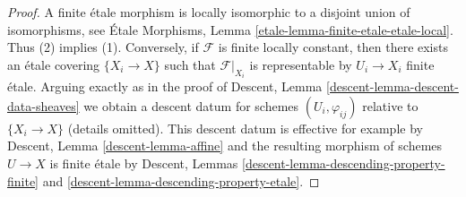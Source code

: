 \documentclass[10pt,a4paper]{amsart}
\theoremstyle{plain}
\theoremstyle{definition}
\theoremstyle{remark}
\numberwithin{equation}{subsection}
\begin{document}
\begin{proof}
A finite \'etale morphism is locally isomorphic to a disjoint union
of isomorphisms, see
\'Etale Morphisms, Lemma \ref{etale-lemma-finite-etale-etale-local}.
Thus (2) implies (1). Conversely, if $\mathcal{F}$ is finite locally
constant, then there exists an \'etale covering $\{X_i \to X\}$ such that
$\mathcal{F}|_{X_i}$ is representable by $U_i \to X_i$ finite \'etale.
Arguing exactly as in the proof of
Descent, Lemma \ref{descent-lemma-descent-data-sheaves}
we obtain a descent datum for schemes $(U_i, \varphi_{ij})$ relative to
$\{X_i \to X\}$ (details omitted). This descent datum is effective for
example by Descent, Lemma \ref{descent-lemma-affine}
and the resulting morphism of schemes $U \to X$ is finite \'etale
by Descent, Lemmas \ref{descent-lemma-descending-property-finite} and
\ref{descent-lemma-descending-property-etale}.
\end{proof}
\end{document}
